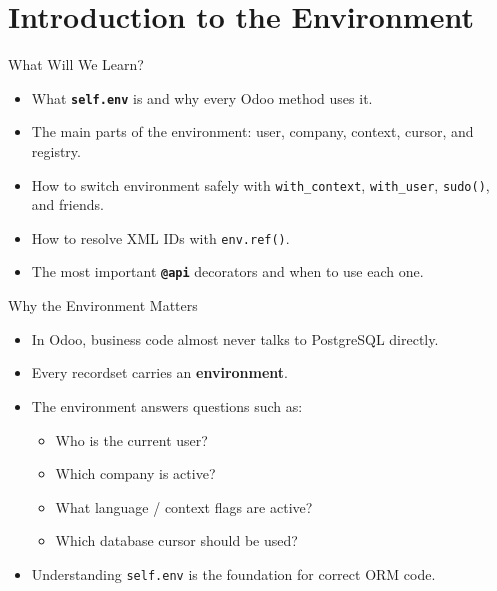 \section{Introduction to the Environment}

\begin{frame}{What Will We Learn?}
	\begin{itemize}
		\item What \textbf{\texttt{self.env}} is and why every Odoo method uses it.
		\item The main parts of the environment: user, company, context, cursor, and registry.
		\item How to switch environment safely with \texttt{with\_context}, \texttt{with\_user}, \texttt{sudo()}, and friends.
		\item How to resolve XML IDs with \texttt{env.ref()}.
		\item The most important \textbf{\texttt{@api}} decorators and when to use each one.
	\end{itemize}
\end{frame}

\begin{frame}{Why the Environment Matters}
	\begin{itemize}
		\item In Odoo, business code almost never talks to PostgreSQL directly.
		\item Every recordset carries an \textbf{environment}.
		\item The environment answers questions such as:
		\begin{itemize}
			\item Who is the current user?
			\item Which company is active?
			\item What language / context flags are active?
			\item Which database cursor should be used?
		\end{itemize}
		\item Understanding \texttt{self.env} is the foundation for correct ORM code.
	\end{itemize}
\end{frame}
